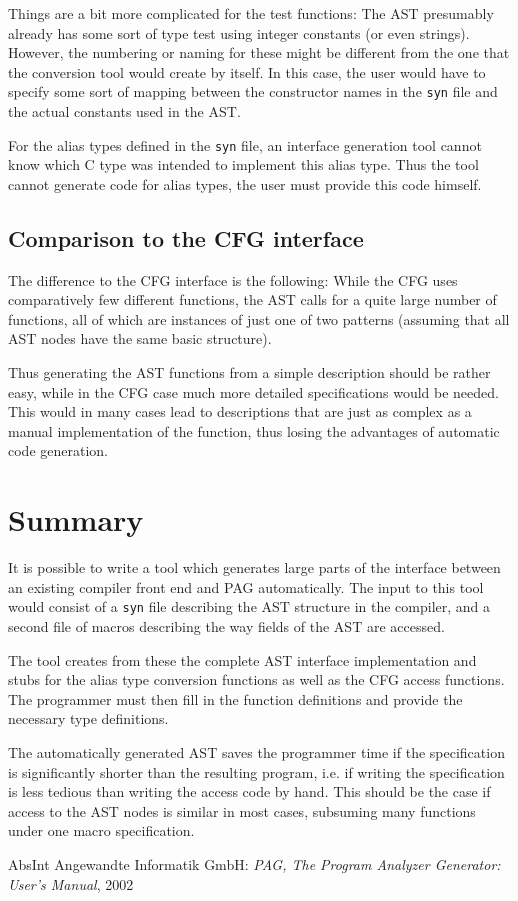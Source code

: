 \documentclass[12pt]{article}
\begin{document}
Things are a bit more complicated for the test functions: The
AST presumably already has some sort of type test using integer
constants (or even strings). However, the numbering or naming for
these might be different from the one that the conversion tool would
create by itself. In this case, the user would have to specify some
sort of mapping between the constructor names in the \verb|syn| file
and the actual constants used in the AST.

For the alias types defined in the \verb|syn| file, an interface
generation tool cannot know which C type was intended to implement
this alias type. Thus the tool cannot generate code for alias types,
the user must provide this code himself.

\subsection{Comparison to the CFG interface}

The difference to the CFG interface is the following: While the CFG
uses comparatively few different functions, the AST calls for a
quite large number of functions, all of which are instances of just
one of two patterns (assuming that all AST nodes have the same basic
structure).

Thus generating the AST functions from a simple description should
be rather easy, while in the CFG case much more detailed
specifications would be needed. This would in many cases lead to
descriptions that are just as complex as a manual implementation
of the function, thus losing the advantages of automatic code
generation.

\section{Summary}

It is possible to write a tool which generates large parts of the
interface between an existing compiler front end and PAG
automatically. The input to this tool would consist of a \verb|syn|
file describing the AST structure in the compiler, and a second file
of macros describing the way fields of the AST are accessed.

The tool creates from these the complete AST interface
implementation and stubs for the alias type conversion functions as
well as the CFG access functions. The programmer must then fill in
the function definitions and provide the necessary type definitions.

The automatically generated AST saves the programmer time if the
specification is significantly shorter than the resulting program,
i.e. if writing the specification is less tedious than writing the
access code by hand. This should be the case if access to the AST
nodes is similar in most cases, subsuming many functions under one
macro specification.

\begin{thebibliography}{0}
 AbsInt Angewandte Informatik GmbH: {\em PAG, The
    Program Analyzer Generator: User's Manual}, 2002
\end{thebibliography}
\end{document}
